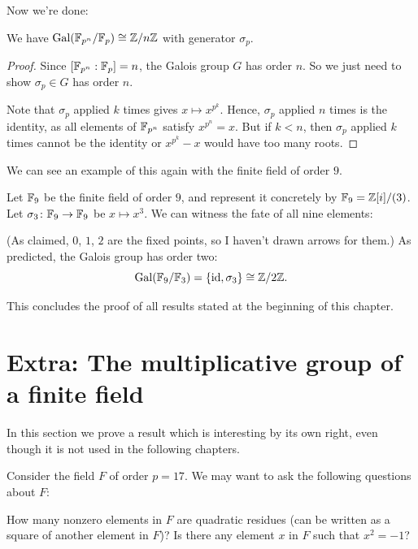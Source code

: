 Now we're done:
\begin{theorem}
	We have $\operatorname{Gal}(\mathbb F_{p^n}/\mathbb F_p) \cong \mathbb Z/n\mathbb Z$ with generator $\sigma_p$.
\end{theorem}
\begin{proof}
	Since $[\mathbb F_{p^n}:\mathbb F_p] = n$, the Galois group $G$ has order $n$.
	So we just need to show $\sigma_p \in G$ has order $n$.

	Note that $\sigma_p$ applied $k$ times gives $x \mapsto x^{p^k}$.
	Hence, $\sigma_p$ applied $n$ times is the identity,
	as all elements of $\mathbb F_{p^n}$ satisfy $x^{p^n}=x$.
	But if $k < n$, then $\sigma_p$ applied $k$ times
	cannot be the identity or $x^{p^k}-x$ would have too many roots.
\end{proof}

We can see an example of this again with the finite field of order $9$.
\begin{example}
	Let $\mathbb F_9$ be the finite field of order $9$,
	and represent it concretely by $\mathbb F_9 = \mathbb Z[i]/(3)$.
	Let $\sigma_3 \colon \mathbb F_9 \to \mathbb F_9$ be $x \mapsto x^3$.
	We can witness the fate of all nine elements:
	\begin{center}
	\end{center}
	(As claimed, $0$, $1$, $2$ are the fixed points,
	so I haven't drawn arrows for them.)
	As predicted, the Galois group has order two:
	\[ \operatorname{Gal}(\mathbb F_9/\mathbb F_3) = \left\{ \mathrm{id}, \sigma_3 \right\} \cong \mathbb Z/2\mathbb Z. \]
\end{example}

This concludes the proof of all results stated at the beginning of this chapter.

\section{Extra: The multiplicative group of a finite field}

In this section we prove a result which is interesting by its own right, even though it is not used
in the following chapters.

Consider the field $F$ of order $p = 17$. We may want to ask the following questions about $F$:
\begin{itemize}
	\ii How many nonzero elements in $F$ are quadratic residues (can be written as a square of
	another element in $F$)?
	\ii Is there any element $x$ in $F$ such that $x^2 = -1$?
\end{itemize}

